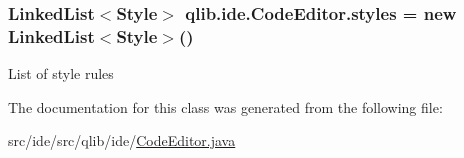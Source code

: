 \subsubsection[{\texorpdfstring{styles}{styles}}]{\setlength{\rightskip}{0pt plus 5cm}Linked\+List$<${\bf Style}$>$ qlib.\+ide.\+Code\+Editor.\+styles = new Linked\+List$<${\bf Style}$>$()\hspace{0.3cm}{\ttfamily [private]}}\hypertarget{classqlib_1_1ide_1_1CodeEditor_a126eb2c62a3df4b9f9ce29685f7a474d}{}\label{classqlib_1_1ide_1_1CodeEditor_a126eb2c62a3df4b9f9ce29685f7a474d}
List of style rules 

The documentation for this class was generated from the following file\+:\begin{DoxyCompactItemize}
\item 
src/ide/src/qlib/ide/\hyperlink{CodeEditor_8java}{Code\+Editor.\+java}\end{DoxyCompactItemize}
